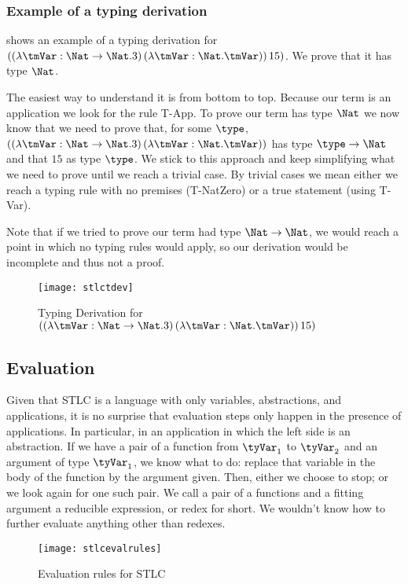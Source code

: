 \subsubsection{Example of a typing derivation}
 shows an example of a typing derivation for $((\lambda \tmVar: \Nat \rightarrow \Nat.3) \, (\lambda \tmVar:\Nat.\tmVar))\,15)$. We prove that it has type $\Nat$.

The easiest way to understand it is from bottom to top. Because our term is an application we look for the rule T-App. To prove our term has type $\Nat$ we now know that we need to prove that, for some $\type$, $((\lambda \tmVar: \Nat \rightarrow \Nat.3) \, (\lambda \tmVar:\Nat.\tmVar))$ has type $\type \rightarrow \Nat$ and that $15$ as type $\type$. We stick to this approach and keep simplifying what we need to prove until we reach a trivial case. By trivial cases we mean either we reach a typing rule with no premises (T-NatZero) or a true statement (using T-Var).

Note that if we tried to prove our term had type $\Nat \rightarrow \Nat$, we would reach a point in which no typing rules would apply, so our derivation would be incomplete and thus not a proof.

\begin{figure}
  \centering
  \texttt{[image: stlctdev]}
  \caption[angle=90]{Typing Derivation for  $((\lambda \tmVar: \Nat \rightarrow \Nat.3) \, (\lambda \tmVar:\Nat.\tmVar))\,15)$}
  \label{stlctydev}
\end{figure}

\subsection{Evaluation}
Given that STLC is a language with only variables, abstractions, and applications, it is no surprise that evaluation steps only happen in the presence of applications. In particular, in an application in which the left side is an abstraction. If we have a pair of a function from $\tyVar_1$ to $\tyVar_2$ and an argument of type $\tyVar_1$, we know what to do: replace that variable in the body of the function by the argument given. Then, either we choose to stop; or we look again for one such pair. We call a pair of a functions and a fitting argument a reducible expression, or redex for short. We wouldn't know how to further evaluate anything other than redexes.

\begin{figure}
  \centering
  \texttt{[image: stlcevalrules]}
  \caption{Evaluation rules for STLC}
  \label{STLC eval}
\end{figure}

